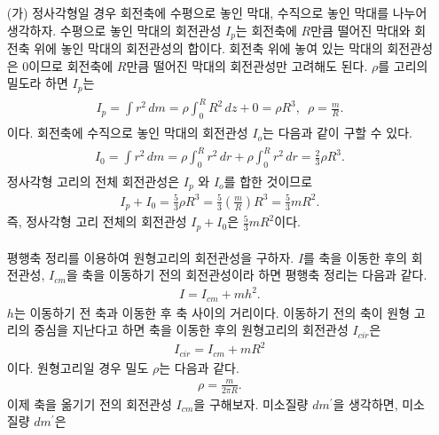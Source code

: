 \documentclass[floatfix,nofootinbib,superscriptaddress,fleqn]{revtex4-2}
\begin{document}
\begin{itemize}
  \item[(가)] 
  정사각형일 경우 회전축에 수평으로 놓인 막대, 수직으로 놓인 막대를 나누어 생각하자. 
  수평으로 놓인 막대의 회전관성 $I_{p}$는 회전축에 $R$만큼
  떨어진 막대와 회전축 위에 놓인 막대의 회전관성의 합이다. 회전축 위에 놓여 있는 막대의
  회전관성은 $0$이므로 회전축에 $R$만큼 떨어진 막대의 회전관성만 고려해도 된다.
  $\rho$를 고리의 밀도라 하면 $I_{p}$는
  \begin{align}
    \begin{split}
      I_{p} = \int r^2\,dm = \rho\int_0^R R^2\,dz + 0 = \rho R^3,\,\,\,
      \rho=\frac{m}{R}.
    \end{split}
  \end{align}
  이다. 회전축에 수직으로 놓인 막대의 회전관성 $I_{o}$는 다음과 같이 구할 수 있다.
  \begin{align}
    \begin{split}
      I_{0} = \int r^2\,dm = \rho\int_0^R r^2\,dr+\rho\int_0^R r^2\,dr
      =\frac{2}{3}\rho R^3. 
    \end{split}
  \end{align}
  정사각형 고리의 전체 회전관성은 $I_{p}$ 와 $I_{o}$를 합한 것이므로
  \begin{align}
    I_{p}+I_{0} = \frac{5}{3}\rho R^3 
    = \frac{5}{3}\left(\frac{m}{R}\right) R^3
    =  \frac{5}{3}mR^2.
  \end{align}
  즉, 정사각형 고리 전체의 회전관성 $I_{p}+I_{0}$은 $\frac{5}{3}mR^2$이다. \\\\
  평행축 정리를 이용하여 원형고리의 회전관성을 구하자. 
  $I$를 축을 이동한 후의 회전관성, $I_{cm}$을 축을 이동하기 전의 회전관성이라 하면
  평행축 정리는 다음과 같다.
  \begin{align}\label{eq:2-1}
    I = I_{cm}+mh^2.
  \end{align}
  $h$는 이동하기 전 축과 이동한 후 축 사이의 거리이다. 
  이동하기 전의 축이 원형 고리의 중심을 지난다고 하면 축을 이동한 후의 
  원형고리의 회전관성 $I_{cir}$은
  \begin{align}
    I_{cir} = I_{cm}+mR^2
  \end{align}
  이다. 원형고리일 경우 밀도 $\rho$는 다음과 같다.
  \begin{align}
    \rho = \frac{m}{2\pi R}.
  \end{align}
  이제 축을 옮기기 전의 회전관성 $I_{cm}$을 구해보자.
  미소질량 $dm^\prime$을 생각하면, 미소질량 $dm^\prime$은
  \begin{align}

\end{align}
\end{itemize}
\end{document}
